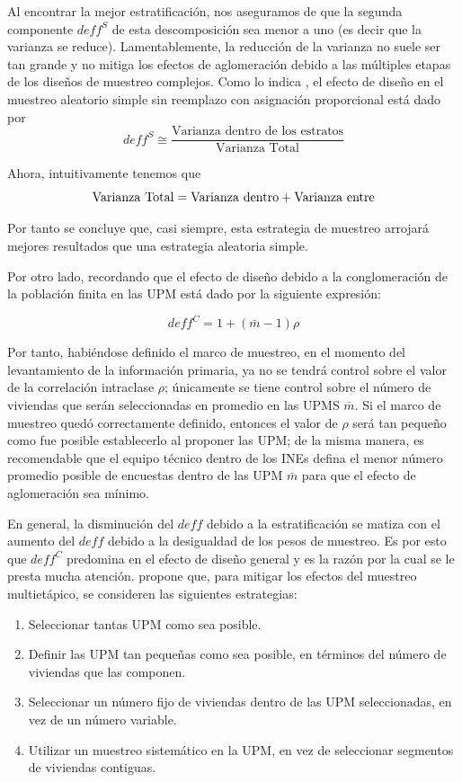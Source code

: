 \documentclass[
  10pt,
  spanish,
]{book}
\providecommand{\tightlist}{%
  \setlength{\itemsep}{0pt}\setlength{\parskip}{0pt}}
\begin{document}
Al encontrar la mejor estratificación, nos aseguramos de que la segunda componente \(deff^S\) de esta descomposición sea menor a uno (es decir que la varianza se reduce). Lamentablemente, la reducción de la varianza no suele ser tan grande y no mitiga los efectos de aglomeración debido a las múltiples etapas de los diseños de muestreo complejos. Como lo indica \citet{Gutierrez_2016}, el efecto de diseño en el muestreo aleatorio simple sin reemplazo con asignación proporcional está dado por
\[
deff^S \cong\frac{\text{Varianza dentro de los estratos}}{\text{Varianza Total}}
\]

Ahora, intuitivamente tenemos que
\[
\rm Varianza \ Total = Varianza \ dentro + Varianza \ entre
\]

Por tanto se concluye que, casi siempre, esta estrategia de muestreo arrojará mejores resultados que una estrategia aleatoria simple.

Por otro lado, recordando que el efecto de diseño debido a la conglomeración de la población finita en las UPM está dado por la siguiente expresión:

\[deff^C = 1 + (\bar m-1)\rho\]

Por tanto, habiéndose definido el marco de muestreo, en el momento del levantamiento de la información primaria, ya no se tendrá control sobre el valor de la correlación intraclase \(\rho\); únicamente se tiene control sobre el número de viviendas que serán seleccionadas en promedio en las UPMS \(\bar m\). Si el marco de muestreo quedó correctamente definido, entonces el valor de \(\rho\) será tan pequeño como fue posible establecerlo al proponer las UPM; de la misma manera, es recomendable que el equipo técnico dentro de los INEs defina el menor número promedio posible de encuestas dentro de las UPM \(\bar m\) para que el efecto de aglomeración sea mínimo.

En general, la disminución del \(deff\) debido a la estratificación se matiza con el aumento del \(deff\) debido a la desigualdad de los pesos de muestreo. Es por esto que \(deff^C\) predomina en el efecto de diseño general y es la razón por la cual se le presta mucha atención. \citet{United_Nations_2008} propone que, para mitigar los efectos del muestreo multietápico, se consideren las siguientes estrategias:

\begin{enumerate}
\def\labelenumi{\arabic{enumi}.}
\tightlist
\item
  Seleccionar tantas UPM como sea posible.
\item
  Definir las UPM tan pequeñas como sea posible, en términos del número de viviendas que las componen.
\item
  Seleccionar un número fijo de viviendas dentro de las UPM seleccionadas, en vez de un número variable.
\item
  Utilizar un muestreo sistemático en la UPM, en vez de seleccionar segmentos de viviendas contiguas.
\end{enumerate}
\end{document}
